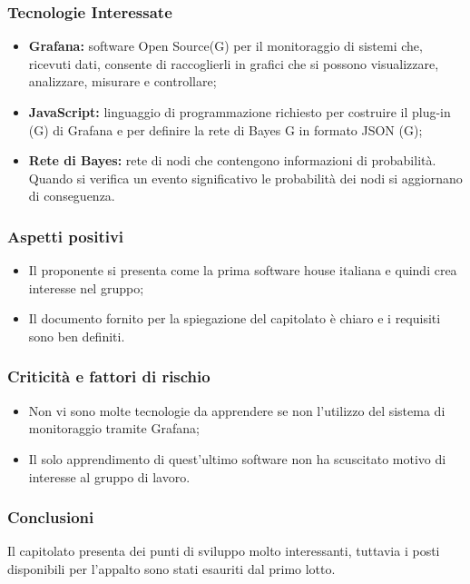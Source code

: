 \subsubsection{Tecnologie Interessate}
\begin{itemize}
	\item \textbf{Grafana: }software Open Source(G) per il monitoraggio di sistemi che, ricevuti dati, consente di raccoglierli            					      in grafici che si possono visualizzare, analizzare, misurare e controllare; 
	\item \textbf{JavaScript: }linguaggio di programmazione richiesto per costruire il plug-in (G) di Grafana e
	per definire la rete di Bayes G in formato JSON (G);
	\item \textbf{Rete di Bayes: }rete di nodi che contengono informazioni di probabilità. Quando si verifica un evento 								     significativo le probabilità dei nodi si aggiornano di conseguenza.
\end{itemize}
\subsubsection{Aspetti positivi}
\begin{itemize}
	\item Il proponente si presenta come la prima software house italiana e quindi crea interesse nel gruppo;
	\item Il documento fornito per la spiegazione del capitolato è chiaro e i requisiti sono ben definiti.
\end{itemize}
\subsubsection{Criticità e fattori di rischio}
\begin{itemize}
	\item Non vi sono molte tecnologie da apprendere se non l'utilizzo del sistema di monitoraggio tramite Grafana;
	\item Il solo apprendimento di quest'ultimo software non ha scuscitato motivo di interesse al gruppo di lavoro.
\end{itemize}
\subsubsection{Conclusioni}
Il capitolato presenta dei punti di sviluppo molto interessanti, tuttavia i posti disponibili per l'appalto sono stati esauriti dal primo lotto.